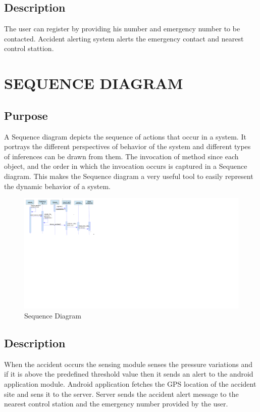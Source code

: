 \documentclass[12pt,a4paper,oneside]{report}
\begin{document}
{\subsection{Description}
\par The user can register by providing his number and emergency number to be contacted. Accident alerting system alerts the emergency contact and nearest control stattion.



\newpage
\section{SEQUENCE DIAGRAM}
\subsection{Purpose}
\par A Sequence diagram depicts the sequence of actions that occur in a system. It portrays the different perspectives of behavior of the system and different types of inferences can be drawn from them. The invocation of method since each object, and the order in which the invocation occurs is captured in a Sequence diagram. This  makes the Sequence diagram a very useful tool to easily represent the dynamic behavior of a system.
\begin{figure}[h]
\begin{center}
\includegraphics[scale=1.2]{seq.png}
\caption{ Sequence Diagram }
\label{ Sequence Diagram}
\end{center}
\end{figure}
\subsection{Description}
\par When the accident occurs the sensing module senses the pressure variations and if it is above the predefined threshold value then it sends an alert to the android application module. Android application fetches the GPS location of the accident site and sens it to the server. Server sends the accident alert message to the nearest control station and the emergency number provided by the user.



}
\end{document}

